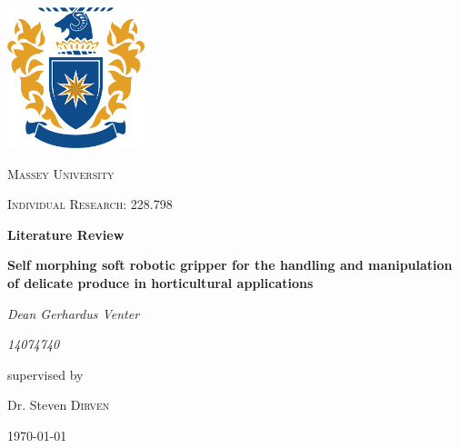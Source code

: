\documentclass[11pt]{article}
\begin{document}
\begin{titlepage}
\centering
	\includegraphics[width=0.30\textwidth]{logo.png}\par\vspace{1cm}
	{\scshape\LARGE Massey University \par}
	\vspace{1cm}
	{\scshape\Large Individual Research: 228.798\par}
	\vspace{1.5cm}
	{\huge\bfseries Literature Review \par}
    \vspace{1cm}
    {\large\bfseries Self morphing soft robotic gripper for the handling and manipulation of delicate produce in horticultural applications\par}
	\vspace{2cm}
	{\large\itshape Dean Gerhardus Venter\par}
	\vspace{2cm}
	{\large\itshape 14074740\par}
	\vfill
	supervised by\par
	Dr. Steven  \textsc{Dirven}
   
	\vfill

	{\large \today \par}
\end{titlepage}
\begin{titlepage}
\tableofcontents
\end{titlepage}
\end{document}
